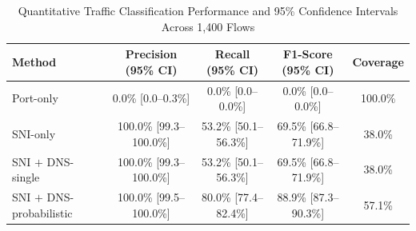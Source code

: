 \begin{table}[t]
\centering
\caption{Quantitative Traffic Classification Performance and 95\% Confidence Intervals Across 1,400 Flows}
\label{tab:statistical_baselines}
\renewcommand{\arraystretch}{1.2}
\begin{tabular}{lcccc}
\hline
\textbf{Method} & \textbf{Precision (95\% CI)} & \textbf{Recall (95\% CI)} & \textbf{F1-Score (95\% CI)} & \textbf{Coverage} \\
\hline
Port-only                    & 0.0\% [0.0--0.3\%] & 0.0\% [0.0--0.0\%] & 0.0\% [0.0--0.0\%] & 100.0\% \\
SNI-only                     & 100.0\% [99.3--100.0\%] & 53.2\% [50.1--56.3\%] & 69.5\% [66.8--71.9\%] & 38.0\% \\
SNI $+$ DNS-single           & 100.0\% [99.3--100.0\%] & 53.2\% [50.1--56.3\%] & 69.5\% [66.8--71.9\%] & 38.0\% \\
SNI $+$ DNS-probabilistic    & 100.0\% [99.5--100.0\%] & 80.0\% [77.4--82.4\%] & 88.9\% [87.3--90.3\%] & 57.1\% \\
\hline
\end{tabular}
\end{table}
